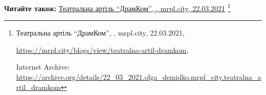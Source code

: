 
 
 
 
 

\def\pubIA{https://archive.org/details/22_03_2021.olga_demidko.mrpl_city.teatralna_artil_dramkom}
\def\pubTitle{Театральна артіль \enquote{ДрамКом}}
\def\pubDate{22.03.2021}
\def\pubOrigin{https://mrpl.city/blogs/view/teatralna-artil-dramkom}
\def\pubAuthor{\pubAuthorDemidko}

\textbf{Читайте також:} \href{\pubIA}{%
\pubTitle, \pubAuthor, mrpl.city, \pubDate}%
\footnote{\pubTitle, \pubAuthor, mrpl.city, \pubDate, \par\url{\pubOrigin}, \par Internet Archive: \url{\pubIA}}
